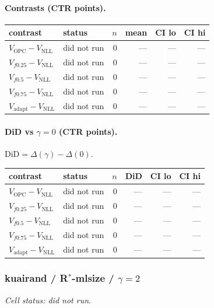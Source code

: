 \documentclass[10pt,a4paper]{article}
\begin{document}
\paragraph{Contrasts (CTR points).}
{\centering\small\begin{tabular}{llrrrr}
\toprule contrast & status & $n$ & mean & CI lo & CI hi \\
\midrule
$V_{\mathrm{OPC}}-V_{\mathrm{NLL}}$ & did not run & 0 & --- & --- & --- \\
$V_{f0.25}-V_{\mathrm{NLL}}$ & did not run & 0 & --- & --- & --- \\
$V_{f0.5}-V_{\mathrm{NLL}}$ & did not run & 0 & --- & --- & --- \\
$V_{f0.75}-V_{\mathrm{NLL}}$ & did not run & 0 & --- & --- & --- \\
$V_{\mathrm{adapt}}-V_{\mathrm{NLL}}$ & did not run & 0 & --- & --- & --- \\
\bottomrule\end{tabular}\par}
\paragraph{DiD vs $\gamma=0$ (CTR points).} $\mathrm{DiD}=\Delta(\gamma)-\Delta(0)$.
{\centering\small\begin{tabular}{llrrrr}
\toprule contrast & status & $n$ & DiD & CI lo & CI hi \\
\midrule
$V_{\mathrm{OPC}}-V_{\mathrm{NLL}}$ & did not run & 0 & --- & --- & --- \\
$V_{f0.25}-V_{\mathrm{NLL}}$ & did not run & 0 & --- & --- & --- \\
$V_{f0.5}-V_{\mathrm{NLL}}$ & did not run & 0 & --- & --- & --- \\
$V_{f0.75}-V_{\mathrm{NLL}}$ & did not run & 0 & --- & --- & --- \\
$V_{\mathrm{adapt}}-V_{\mathrm{NLL}}$ & did not run & 0 & --- & --- & --- \\
\bottomrule\end{tabular}\par}
\bigskip
\subsubsection{kuairand / R$^*$-mlsize / $\gamma=2$}
\emph{Cell status: did not run}.
\end{document}
